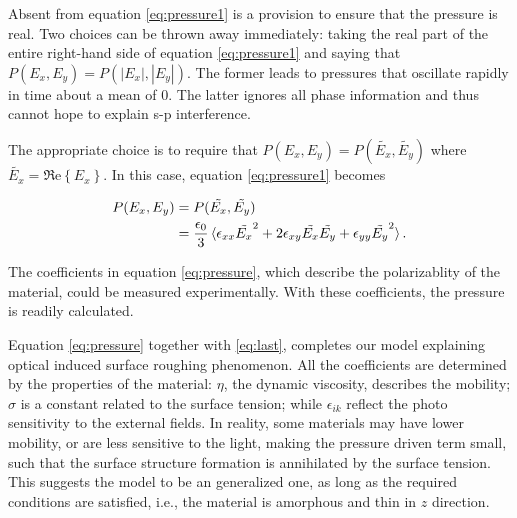 \documentclass[aps, prl, twocolumn, groupedaddress]{revtex4-1}
\begin{document}

Absent from equation
\ref{eq:pressure1} is a provision to ensure that the pressure is real.
Two choices can be thrown away immediately: taking the real part of
the entire right-hand side of equation \ref{eq:pressure1} and saying
that $P(E_x,E_y)=P(|E_x|,|E_y|)$. The former leads to pressures that
oscillate rapidly in time about a mean of 0. The latter ignores all
phase information and thus cannot hope to explain s-p interference.

The appropriate choice is to require that
$P(E_x,E_y)=P(\tilde{E_x},\tilde{E_y})$ where
$\tilde{E_x}=\Re\mathrm{e}\left\{E_x\right\}$. In this
case,
equation \ref{eq:pressure1} becomes

\begin{equation}
  \label{eq:pressure}
  \begin{split}
    P(E_x,E_y) &= P(\tilde{E_x},\tilde{E_y})\\
    &= \frac{\epsilon_0}{3}\braket{\epsilon_{xx}\tilde{E_x}^2 + 2
      \epsilon_{xy}\tilde{E_x}\tilde{E_y} +
      \epsilon_{yy}\tilde{E_y}^2} \mathrm{.}\\
  \end{split}
\end{equation}

The coefficients in equation \ref{eq:pressure}, which describe the
polarizablity of the material, could be measured experimentally. With
these coefficients, the pressure is readily calculated.

Equation \ref{eq:pressure} together with \ref{eq:last}, completes our
model explaining optical induced surface roughing phenomenon. All the
coefficients are determined by the properties of the material: $\eta$,
the dynamic viscosity, describes the mobility; $\sigma$ is a constant
related to the surface tension; while $\epsilon_{ik}$ reflect the
photo sensitivity to the external fields. In reality, some materials may
have lower mobility, or are less sensitive to the light, making the
pressure driven term small, such that the surface structure
formation is annihilated by the surface tension.
This suggests the model to be an generalized one, as long as the
required conditions are satisfied, i.e., the material is amorphous and
thin in $z$ direction.
\end{document}
